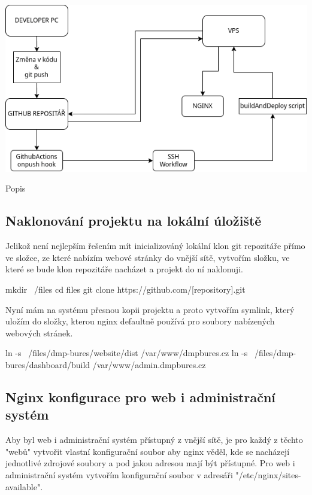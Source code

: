 \documentclass[12pt,a4paper]{report}
\begin{document}
  \vspace*{0.5cm}
  \noindent\includegraphics[width=\linewidth]{CIDC_visualization.png}
  \begin{center}
    Popis
  \end{center}
  \vspace*{0.5cm}

  \subsection{Naklonování projektu na lokální úložiště}
  Jelikož není nejlepším řešením mít inicializováný lokální klon git repozitáře přímo ve složce, ze které 
  nabízím webové stránky do vnější sítě, vytvořím složku, ve které se bude klon repozitáře nacházet a projekt do ní naklonuji.
  \begin{bash}
    mkdir ~/files
    cd files
    git clone https://github.com/[repository].git 
  \end{bash}
  
  Nyní mám na systému přesnou kopii projektu a proto vytvořím symlink, který uložím do složky,
  kterou nginx defaultně používá pro soubory nabízených webových stránek.

  \begin{bash}
    ln -s ~/files/dmp-bures/website/dist /var/www/dmpbures.cz
    ln -s ~/files/dmp-bures/dashboard/build /var/www/admin.dmpbures.cz
  \end{bash}

  \subsection{Nginx konfigurace pro web i administrační systém}
  Aby byl web i administrační systém přístupný z vnější sítě, je pro každý z těchto "webů"  vytvořit 
  vlastní konfigurační soubor aby nginx věděl, kde se nacházejí jednotlivé zdrojové soubory a 
  pod jakou adresou mají být přístupné.
  Pro web i administrační systém vytvořím konfigurační soubor v adresáři "/etc/nginx/sites-available".
  
\end{document}
